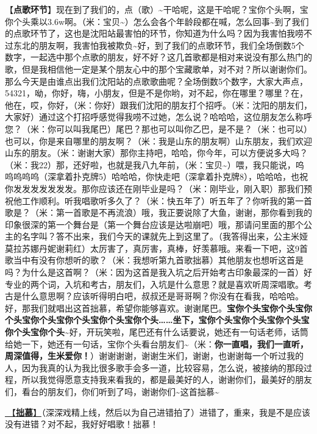 \documentclass[]{ctexbook}
\begin{document}
【\textbf{点歌环节}】现在到了我们的，点（歌）\textasciitilde 干哈呢，这是干哈呢？宝你个头啊，宝你个头乘以3.6w啊。（米：宝贝\textasciitilde）怎么会各个年龄段都在喊，怎么回事\textasciitilde 到了我们的点歌环节了，这也是沈阳站最害怕的环节，你知道为什么吗？因为我害怕我唠不过东北的朋友啊，我害怕我被欺负\textasciitilde 好，到了我们的点歌环节，我们全场倒数5个数字，一起选中那个点歌的朋友，好不好？这几首歌都是相对来说没有那么热门的歌，但是我相信他一定是某个朋友心中的那个宝藏歌单，对不对？所以谢谢你们。那么今天是由谁点出我们沈阳站的点歌歌曲呢？全场倒数5个数字，大家大声点，54321，呦，你好，嗨，小朋友，但是不是你哟，对不起，你在哪里？哪里？在，他在，哎，你好，（米：你好）跟我们沈阳的朋友打个招呼。（米：沈阳的朋友们，大家好）通过这个打招呼感觉得我唠不过她，怎么说？哈哈哈，这位朋友怎么称呼您？（米：你可以叫我尾巴）尾巴？那也可以叫你乙巴，是不是？（米：也可以）也可以，你是来自哪里的朋友啊？（米：我是山东的朋友啊）山东朋友，我们欢迎山东的朋友。（米：谢谢大家）那你主持吧，哈哈，你今年，可以方便说多大吗？（米：我22）那，还好啦，也就是我八九年前，（米：宝贝\textasciitilde）喂，我只能说，呜呜呜呜呜（深拿着扑克牌5）哈哈哈，你快走吧（深拿着扑克牌8），哈哈哈，也祝你发发发发发发发。那你应该还在刚毕业是吗？（米：刚毕业，刚入职）那我们预祝他工作顺利。听我唱歌听多久了？（米：快五年了）听五年了？你听我的第一首歌是？（米：第一首歌是不再流浪）哦，我正要说除了大鱼，谢谢，那你看到我的印象很深的第一个舞台是（第一个舞台应该是达啦崩吧）哦，那请问里面的那个公主的名字叫？答不出来，我们今天的课就先上到这里了。（我答得出来，公主米娅莫拉苏娜丹妮谢莉红）太厉害了，真厉害，真棒，好羡慕哦。来看一下吧，这9首歌当中有没有你想听的歌？（米：我想听第九首歌拙慕）其他朋友也想听这首是吗？为什么是这首啊？（米：因为这首是我入坑之后开始考古印象最深的一首）好专业的两个词，入坑和考古，朋友们，入坑是什么意思？就是喜欢听周深唱歌。考古是什么意思啊？应该听得明白吧，叔叔还是哥哥啊？你没有在看我，哈哈哈。好，那我们就唱出这首拙慕，希望你能够喜欢。谢谢尾巴。\textbf{宝你个头宝你个头宝你个头宝你个头宝你个头宝你个头宝你个头\ldots\ldots 坐下，宝你个头宝你个头宝你个头宝你个头宝你个头\textasciitilde{}}好，开玩笑啦，尾巴还有什么话要说，她还有一句话老师，话筒给她一下，她还有一句话，宝你个头看台朋友们\textasciitilde（米：\textbf{你一直唱，我们一直听，周深值得，生米爱你！}）谢谢谢谢，谢谢生米们，谢谢，也谢谢每一个听过我的人，因为我真的认为我比很多歌手会多一道，比较容易，怎么说，被接纳的那段过程，所以我觉得愿意支持我来看我的，都是最美好的人，谢谢你们，最美好的朋友们，看台的朋友们，你们听到了吗，谢谢你们\textasciitilde 这首拙慕\textasciitilde{}

\hyperref[inferior-admiration]{🎵【\textbf{拙慕}】}（深深戏精上线，然后以为自己进错拍了）进错了，重来，我是不是应该没有进错？对不起，我好好唱歌！拙慕！
\end{document}
